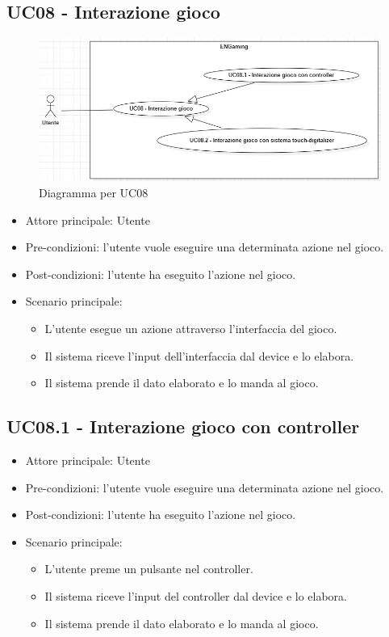 \subsection{UC08 - Interazione gioco}
\begin{figure}[h]
    \centering
    \includegraphics[width=400pt]{images/usecase/UC08.png}
    \caption{Diagramma per UC08}
    \label{fig:UC08}
\end{figure}
\begin{itemize}
    \item Attore principale: Utente
    \item Pre-condizioni: l'utente vuole eseguire una determinata azione nel gioco.
    \item Post-condizioni: l'utente ha eseguito l'azione nel gioco.
    \item Scenario principale: \begin{itemize}
        \item L'utente esegue un azione attraverso l'interfaccia del gioco.
        \item Il sistema riceve l'input dell'interfaccia dal device e lo elabora.
        \item Il sistema prende il dato elaborato e lo manda al gioco.
    \end{itemize}
\end{itemize}

\subsection{UC08.1 - Interazione gioco con controller}
\begin{itemize}
    \item Attore principale: Utente
    \item Pre-condizioni: l'utente vuole eseguire una determinata azione nel gioco.
    \item Post-condizioni: l'utente ha eseguito l'azione nel gioco.
    \item Scenario principale: \begin{itemize}
        \item L'utente preme un pulsante nel controller.
        \item Il sistema riceve l'input del controller dal device e lo elabora.
        \item Il sistema prende il dato elaborato e lo manda al gioco.
    \end{itemize}
\end{itemize}

